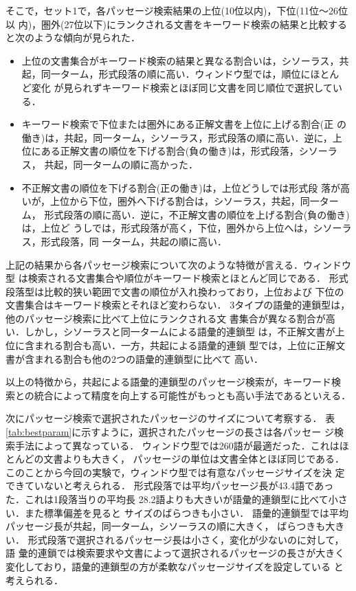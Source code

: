 そこで，セット1で，各パッセージ検索結果の上位(10位以内)，下位(11位〜26位以
内)，圏外(27位以下)にランクされる文書をキーワード検索の結果と比較する
と次のような傾向が見られた．

\begin{itemize}
\item 上位の文書集合がキーワード検索の結果と異なる割合いは，シソーラス，共
	起，同一ターム，形式段落の順に高い．ウィンドウ型では，順位にほとん
ど変化
	が見られずキーワード検索とほぼ同じ文書を同じ順位で選択している．

\item キーワード検索で下位または圏外にある正解文書を上位に上げる割合(正
の働き)は，共起，同一ターム，シソーラス，形式段落の順に高い．逆に，上
位にある正解文書の順位を下げる割合(負の働き)は，形式段落，シソーラス，
共起，同一タームの順に高かった．

\item 不正解文書の順位を下げる割合(正の働き)は，上位どうしでは形式段
落が高いが，上位から下位，圏外へ下げる割合は，シソーラス，共起，同一ターム，
形式段落の順に高い．逆に，不正解文書の順位を上げる割合(負の働き)は，上位ど
うしでは，形式段落が高く，下位，圏外から上位へは，シソーラス，形式段落，同
一ターム，共起の順に高い．
\end{itemize}

上記の結果から各パッセージ検索について次のような特徴が言える．ウィンドウ型
は検索される文書集合や順位がキーワード検索とほとんど同じである．
形式段落型は比較的狭い範囲で文書の順位が入れ換わっており，上位および
下位の文書集合はキーワード検索とそれほど変わらない．
3タイプの語彙的連鎖型は，他のパッセージ検索に比べて上位にランクされる文
書集合が異なる割合が高い．しかし，シソーラスと同一タームによる語彙的連鎖型
は，不正解文書が上位に含まれる割合も高い．一方，共起による語彙的連鎖
型では，上位に正解文書が含まれる割合も他の2つの語彙的連鎖型に比べて
高い．

以上の特徴から，共起による語彙的連鎖型のパッセージ検索が，キーワード検
索との統合によって精度を向上する可能性がもっとも高い手法であるといえる．

次にパッセージ検索で選択されたパッセージのサイズについて考察する．
表\ref{tab:bestparam}に示すように，選択されたパッセージの長さは各パッセー
ジ検索手法によって異なっている．
ウィンドウ型では260語が最適だった．これはほとんどの文書よりも大きく，
パッセージの単位は文書全体とほぼ同じである．
このことから今回の実験で，ウィンドウ型では有意なパッセージサイズを決
定できていないと考えられる．
形式段落では平均パッセージ長が43.4語であった．これは1段落当りの平均長
28.2語よりも大きいが語彙的連鎖型に比べて小さい．また標準偏差を見ると
サイズのばらつきも小さい．
語彙的連鎖型では平均パッセージ長が共起，同一ターム，シソーラスの順に大きく，
ばらつきも大きい．
形式段落で選択されるパッセージ長は小さく，変化が少ないのに対して，語
彙的連鎖では検索要求や文書によって選択されるパッセージの長さが大きく
変化しており，語彙的連鎖型の方が柔軟なパッセージサイズを設定している
と考えられる．

